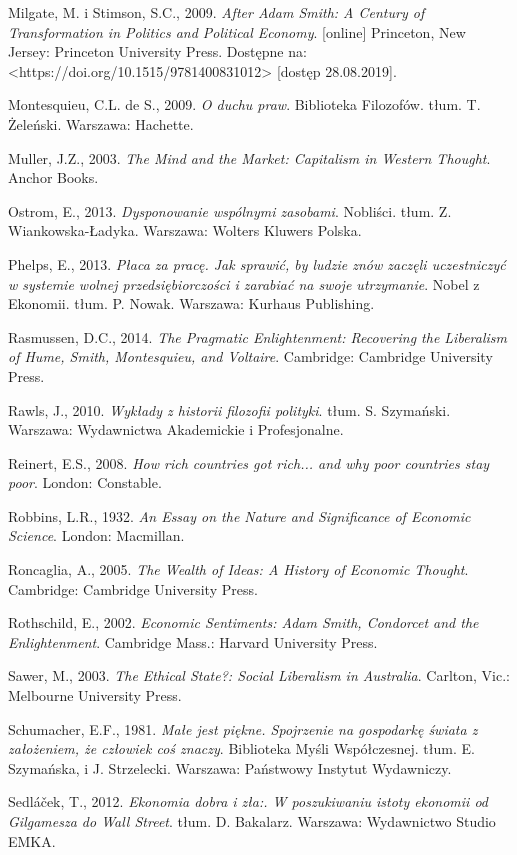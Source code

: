 \documentclass[a4paper]{article}
\begin{document}
Milgate, M. i Stimson, S.C., 2009. \textit{After Adam Smith: A Century of Transformation in Politics and Political
Economy}. [online] Princeton, New Jersey: Princeton University Press. Dostępne na:
{\textless}https://doi.org/10.1515/9781400831012{\textgreater} [dostęp 28.08.2019].

Montesquieu, C.L. de S., 2009. \textit{O duchu praw}. Biblioteka Filozofów. tłum. T. Żeleński. Warszawa: Hachette.

Muller, J.Z., 2003. \textit{The Mind and the Market: Capitalism in Western Thought}. Anchor Books.

Ostrom, E., 2013. \textit{Dysponowanie wspólnymi zasobami}. Nobliści. tłum. Z. Wiankowska-Ładyka. Warszawa: Wolters
Kluwers Polska.

Phelps, E., 2013. \textit{Płaca za pracę. Jak sprawić, by ludzie znów zaczęli uczestniczyć w systemie wolnej
przedsiębiorczości i zarabiać na swoje utrzymanie}. Nobel z Ekonomii. tłum. P. Nowak. Warszawa: Kurhaus Publishing.

Rasmussen, D.C., 2014. \textit{The Pragmatic Enlightenment: Recovering the Liberalism of Hume, Smith, Montesquieu, and
Voltaire}. Cambridge: Cambridge University Press.

Rawls, J., 2010. \textit{Wykłady z historii filozofii polityki}. tłum. S. Szymański. Warszawa: Wydawnictwa Akademickie i
Profesjonalne.

Reinert, E.S., 2008. \textit{How rich countries got rich... and why poor countries stay poor}. London: Constable.

Robbins, L.R., 1932. \textit{An Essay on the Nature and Significance of Economic Science}. London: Macmillan.

Roncaglia, A., 2005. \textit{The Wealth of Ideas: A History of Economic Thought}. Cambridge: Cambridge University Press.

Rothschild, E., 2002. \textit{Economic Sentiments: Adam Smith, Condorcet and the Enlightenment}. Cambridge Mass.:
Harvard University Press.

Sawer, M., 2003. \textit{The Ethical State?: Social Liberalism in Australia}. Carlton, Vic.: Melbourne University Press.

Schumacher, E.F., 1981. \textit{Małe jest piękne. Spojrzenie na gospodarkę świata z założeniem, że człowiek coś znaczy}.
Biblioteka Myśli Współczesnej. tłum. E. Szymańska, i J. Strzelecki. Warszawa: Państwowy Instytut Wydawniczy.

Sedláček, T., 2012. \textit{Ekonomia dobra i zła:. W poszukiwaniu istoty ekonomii od Gilgamesza do Wall Street}. tłum.
D. Bakalarz. Warszawa: Wydawnictwo Studio EMKA.
\end{document}
